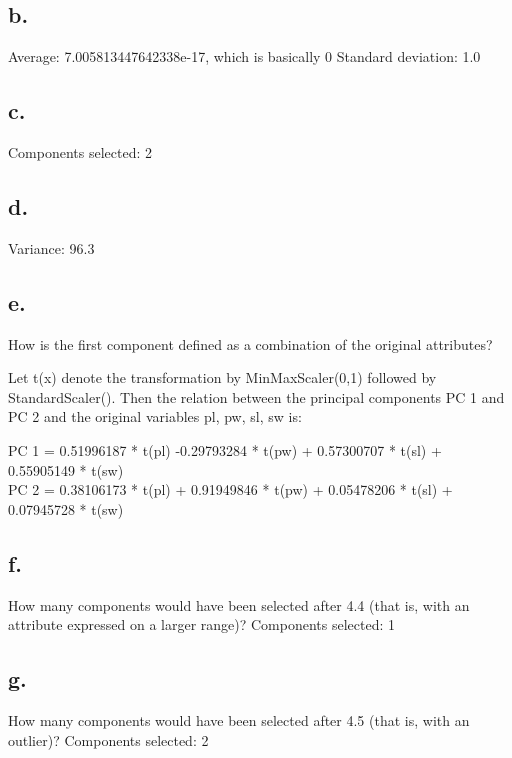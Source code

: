 \documentclass{article}
\begin{document}
\subsection*{b.}
Average: 7.005813447642338e-17, which is basically 0
Standard deviation: 1.0

\subsection*{c.}
Components selected: 2

\subsection*{d.}
Variance: 96.3%

\subsection*{e.}
How is the first component defined as a combination of the original attributes?

Let t(x) denote the transformation by MinMaxScaler(0,1) followed by StandardScaler(). Then the relation between the 
principal components PC 1 and PC 2 and the original variables pl, pw, sl, sw is:

PC 1 = 0.51996187 * t(pl) -0.29793284 * t(pw) + 0.57300707 * t(sl) + 0.55905149 * t(sw) \\
PC 2 = 0.38106173 * t(pl) + 0.91949846 * t(pw) + 0.05478206 * t(sl) + 0.07945728 * t(sw)



\subsection*{f.}
How many components would have been selected after 4.4 (that is, with an
attribute expressed on a larger range)?
Components selected: 1

\subsection*{g.}
How many components would have been selected after 4.5 (that is, with an
outlier)?
Components selected: 2
\end{document}
